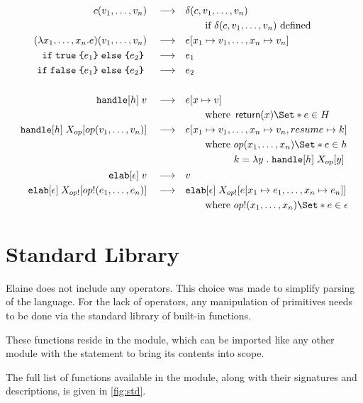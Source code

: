 
\newcommand{\reduce}{\quad\longrightarrow\quad}
\begin{align*}
    c(v_1, \dots, v_n) \reduce& \delta(c, v_1, \dots, v_n) \\
    &\qquad\text{if } \delta(c, v_1, \dots, v_n) \text{ defined}\\
    (\lambda x_1, \dots, x_n . e) (v_1, \dots, v_n) \reduce& e[x_1 \mapsto v_1, \dots, x_n \mapsto v_n] \\
    \cond{\true}{e_1}{e_2} \reduce& e_1 \\
    \cond{\false}{e_1}{e_2} \reduce& e_2 \\
    \\
    \kw{handle}[h]\;v \reduce& e[x\mapsto v] \\
    &\qquad\text{where } \return(x) \S{ e } \in H\\
    \kw{handle}[h]\;X_{op}[op(v_1, \dots, v_n)] \reduce& e[x_1\mapsto v_1, \dots, x_n\mapsto v_n, resume \mapsto k] \\
    &\qquad \text{where } \begin{aligned}[t]
        & op(x_1, \dots, x_n) \S{e} \in h\\
        & k = \lam{y}{\kw{handle}[h]\;
        X_{op}[y]}
    \end{aligned}\\
    \kw{elab}[\epsilon]\;v \reduce& v\\
    \kw{elab}[\epsilon]\;X_{op!}[op!(e_1, \dots, e_n)] \reduce& \kw{elab}[\epsilon]\;X_{op!}[e[x_1 \mapsto e_1, \dots, x_n \mapsto e_n]] \\
    &\qquad \text{where } op!(x_1, \dots, x_n) \S{e} \in \epsilon \\
\end{align*}

\section{Standard Library}\label{sec:std}

Elaine does not include any operators. This choice was made to simplify parsing of the language. For the lack of operators, any manipulation of primitives needs to be done via the standard library of built-in functions.

These functions reside in the  module, which can be imported like any other module with the  statement to bring its contents into scope.

The full list of functions available in the  module, along with their signatures and descriptions, is given in \cref{fig:std}.

